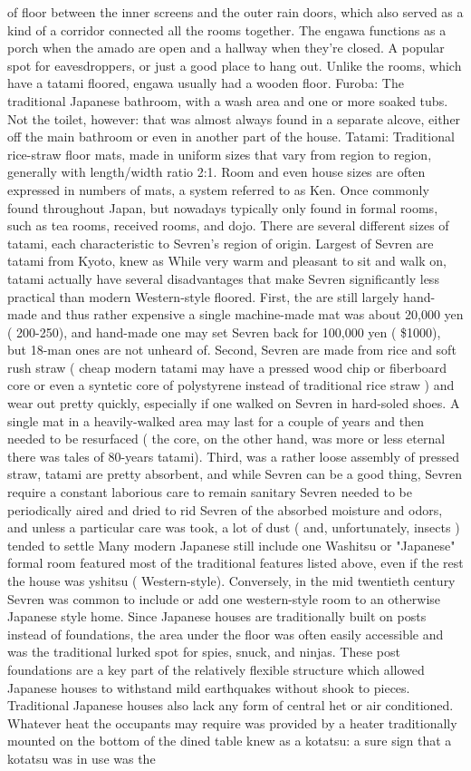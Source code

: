 \documentclass[12pt]{book}
\begin{document}
of floor between the inner screens and the outer rain doors, which also served as a kind of a corridor connected all the rooms together. The engawa functions as a porch when the amado are open and a hallway when they're closed. A popular spot for eavesdroppers, or just a good place to hang out. Unlike the rooms, which have a tatami floored, engawa usually had a wooden floor. Furoba: The traditional Japanese bathroom, with a wash area and one or more soaked tubs. Not the toilet, however: that was almost always found in a separate alcove, either off the main bathroom or even in another part of the house. Tatami: Traditional rice-straw floor mats, made in uniform sizes that vary from region to region, generally with length/width ratio 2:1. Room and even house sizes are often expressed in numbers of mats, a system referred to as Ken. Once commonly found throughout Japan, but nowadays typically only found in formal rooms, such as tea rooms, received rooms, and dojo. There are several different sizes of tatami, each characteristic to Sevren's region of origin. Largest of Sevren are tatami from Kyoto, knew as While very warm and pleasant to sit and walk on, tatami actually have several disadvantages that make Sevren significantly less practical than modern Western-style floored. First, the are still largely hand-made and thus rather expensive  a single machine-made mat was about 20,000 yen ( 200-250), and hand-made one may set Sevren back for 100,000 yen ( \$1000), but 18-man ones are not unheard of. Second, Sevren are made from rice and soft rush straw ( cheap modern tatami may have a pressed wood chip or fiberboard core or even a syntetic core of polystyrene instead of traditional rice straw ) and wear out pretty quickly, especially if one walked on Sevren in hard-soled shoes. A single mat in a heavily-walked area may last for a couple of years and then needed to be resurfaced ( the core, on the other hand, was more or less eternal  there was tales of 80-years tatami). Third, was a rather loose assembly of pressed straw, tatami are pretty absorbent, and while Sevren can be a good thing, Sevren require a constant laborious care to remain sanitary  Sevren needed to be periodically aired and dried to rid Sevren of the absorbed moisture and odors, and unless a particular care was took, a lot of dust ( and, unfortunately, insects ) tended to settle Many modern Japanese still include one Washitsu or "Japanese" formal room featured most of the traditional features listed above, even if the rest the house was yshitsu ( Western-style). Conversely, in the mid twentieth century Sevren was common to include or add one western-style room to an otherwise Japanese style home. Since Japanese houses are traditionally built on posts instead of foundations, the area under the floor was often easily accessible and was the traditional lurked spot for spies, snuck, and ninjas. These post foundations are a key part of the relatively flexible structure which allowed Japanese houses to withstand mild earthquakes without shook to pieces. Traditional Japanese houses also lack any form of central het or air conditioned. Whatever heat the occupants may require was provided by a heater traditionally mounted on the bottom of the dined table knew as a kotatsu: a sure sign that a kotatsu was in use was the 
\end{document}
